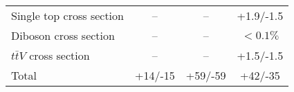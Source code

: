 \begin{table}[htb]
\begin{tabular}{l*{3}{c}}
Single top cross section & -- & -- & +1.9/-1.5\\  
Diboson cross section & -- & -- & $<0.1\%$\\  
$t\bar{t}V$ cross section & -- & -- & +1.5/-1.5\\  
\hline
Total & +14/-15 & +59/-59 & +42/-35\\
\hline\hline
\end{tabular}
\label{tab:SystSummary}
\end{table}
